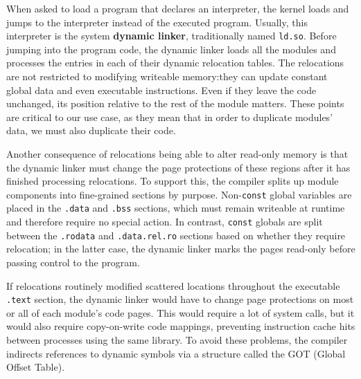 When asked to load a program that declares an interpreter, the kernel loads and jumps
to the interpreter instead of the executed program.  Usually, this interpreter is the
system \textbf{dynamic linker}, traditionally named \texttt{ld.so}.  Before jumping
into the program code, the dynamic linker loads all the modules and processes the
entries in each of their dynamic relocation tables.  The relocations are not
restricted to modifying writeable memory:\@ they can update constant global data and
even executable instructions.  Even if they leave the code unchanged, its position
relative to the rest of the module matters.  These points are critical to our use
case, as they mean that in order to duplicate modules' data, we must also duplicate
their code.

Another consequence of relocations being able to alter read-only memory is that the
dynamic linker must change the page protections of these regions after it has
finished
processing relocations.  To support this, the compiler splits up module components
into fine-grained sections by purpose.  Non-\texttt{const} global variables are
placed in the \texttt{.data} and \texttt{.bss} sections, which must remain writeable
at runtime and therefore require no special action.  In contrast, \texttt{const}
globals are split between the \texttt{.rodata} and \texttt{.data.rel.ro} sections
based on whether they require relocation; in the latter case, the dynamic linker
marks the pages read-only before passing control to the program.

If relocations routinely modified scattered locations throughout the executable
\texttt{.text} section, the dynamic linker would have to change page protections on
most or all of each module's code pages.  This would require a lot of system calls,
but it would also require copy-on-write code mappings, preventing instruction cache
hits between processes using the same library.  To avoid these problems, the compiler
indirects references to dynamic symbols via a structure called the GOT (Global Offset
Table).


